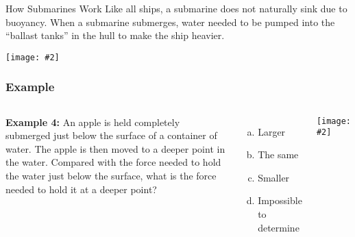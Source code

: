 \documentclass[12pt,aspectratio=169]{beamer}
\newcommand{\pic}[2]{\texttt{[image: \#2]}}
\newcommand{\mb}[1]{\mathbf{#1}}
\begin{document}
\begin{frame}{How Submarines Work}
  Like all ships, a submarine does not naturally sink due to buoyancy. When a
  submarine submerges, water needed to be pumped into the  ``ballast tanks'' in
  the hull to make the ship heavier.
  \begin{center}
    \pic{1}{risinglemur.jpg}
  \end{center}
\end{frame}



%  



\begin{frame}
  \frametitle{Example}
  \begin{columns}

    \textbf{Example 4:} An apple is held completely submerged just below the
    surface of a container of water. The apple is then moved to a deeper point
    in the water. Compared with the force needed to hold the water just below
    the surface, what is the force needed to hold it at a deeper point?
    \begin{enumerate}[(a)]
    \item Larger
    \item The same
    \item Smaller
    \item Impossible to determine
    \end{enumerate}

    \pic{1}{apple.jpg}
  \end{columns}
\end{frame}
\end{document}
